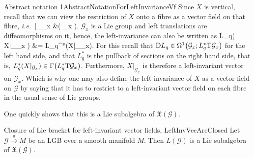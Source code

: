 \documentclass[a4paper,oneside,11pt,bibliography=totoc]{scrartcl}
\def\ba#1\ea{\begin{align}#1\end{align}}
\def\bas#1\eas{\begin{align*}#1\end{align*}}
\theoremstyle{plain}
\theoremstyle{remark}
\theoremstyle{definition}
\begin{document}
\begin{remarks}{Abstract notation 1}{AbstractNotationForLeftInvarianceVf}
Since $X$ is vertical, recall that we can view the restriction of $X$ onto a fibre as a vector field on that fibre, \textit{i.e.}\
\bas
X|_{_x} &\in {}\mleft( _x \mright).
\eas
$\mathcal{G}_x$ is a Lie group and left translations are diffeomorphisms on it, hence, the left-invariance can also be written as
\ba
\mathrm{D}L_q\mleft( X|_{_x} \mright) &= L_q^*\mleft(X|_{_x}\mright).
\ea
For this recall that $\mathrm{D}L_q \in \Omega^1\mleft(\mathcal{G}_x; L_q^*\mathrm{T}\mathcal{G}_x\mright)$ for the left hand side, and that $L_q^*$ is the pullback of sections on the right hand side, that is, $L_q^*\mleft(X|_{\mathcal{G}_x}\mright) \in \Gamma\mleft(L_q^*\mathrm{T}\mathcal{G}_x\mright)$.
Furthermore, $X|_{\mathcal{G}_x}$ is therefore a left-invariant vector on $\mathcal{G}_x$. Which is why one may also define the left-invariance of $X$ as a vector field on $\mathcal{G}$ by saying that it has to restrict to a left-invariant vector field on each fibre in the usual sense of Lie groups.
\end{remarks}

One quickly shows that this is a Lie subalgebra of $\mathfrak{X}(\mathcal{G})$.

\begin{lemmata}{Closure of Lie bracket for left-invariant vector fields, \newline \cite[\S 3.5, special situation of Lemma 3.5.5, page 122]{mackenzieGeneralTheory}}{LeftInvVecAreClosed}
Let $\mathcal{G} \stackrel{\pi}{\to} M$ be an LGB over a smooth manifold $M$. Then $L(\mathcal{G})$ is a Lie subalgebra of $\mathfrak{X}(\mathcal{G})$.
\end{lemmata}
\end{document}

